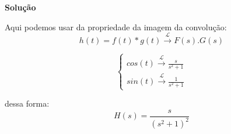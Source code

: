 \linespread{1.5}

\textbf{Solução}

Aqui podemos usar da propriedade da imagem da convolução:
\begin{equation*}
    h(t) = f(t)*g(t) \xrightarrow{\mathcal{L}} F(s).G(s)
\end{equation*}

\begin{equation*}
    \begin{cases}
    cos(t) \xrightarrow{\mathcal{L}} \frac{s}{s^2+1}\\
    sin(t) \xrightarrow{\mathcal{L}} \frac{1}{s^2+1}
    \end{cases}
\end{equation*}

dessa forma:
\begin{equation*}
    H(s) = \frac{s}{(s^2+1)^2}
\end{equation*}